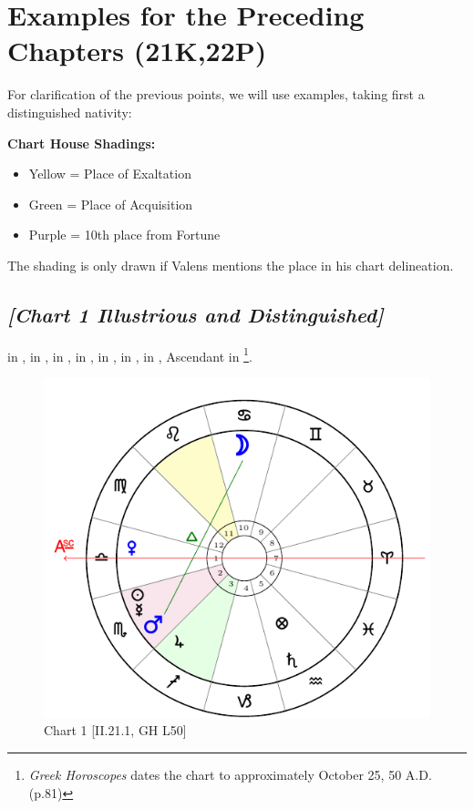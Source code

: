 \section{Examples for the Preceding Chapters (21K,22P)}
For clarification of the previous points, we will use examples, taking first a distinguished nativity:

\begin{mdframed}[backgroundcolor=cyan!5]
\textbf{Chart House Shadings:}
\vspace{-1em}
\begin{itemize}
 \setlength\itemsep{-0.5em}
\item Yellow = Place of Exaltation
\item Green = Place of Acquisition
\item Purple = 10th place from Fortune
\end{itemize}
\vspace{-1em}
The shading is only drawn if Valens mentions the place in his chart delineation.
\end{mdframed}

\subsection*{\textit{[Chart 1 Illustrious and Distinguished]}}

\Sun\xspace in \Scorpio, \Moon\xspace in \Cancer, \Saturn\xspace in \Aquarius, \Jupiter\xspace in \Sagittarius, \Mars\xspace in \Scorpio, \Venus\xspace in \Libra, \Mercury\xspace in \Scorpio, Ascendant in \Libra
\footnote{\textit{Greek Horoscopes} dates the chart to approximately October 25, 50 A.D. (p.81)}. 

\clearpage
\begin{figure}
\centering
\vspace{-20pt}
\includegraphics[width=.68\textwidth]{charts/2_21_1}
\caption{Chart 1 [II.21.1, GH L50]}
\label{fig:chart01}
\end{figure}

